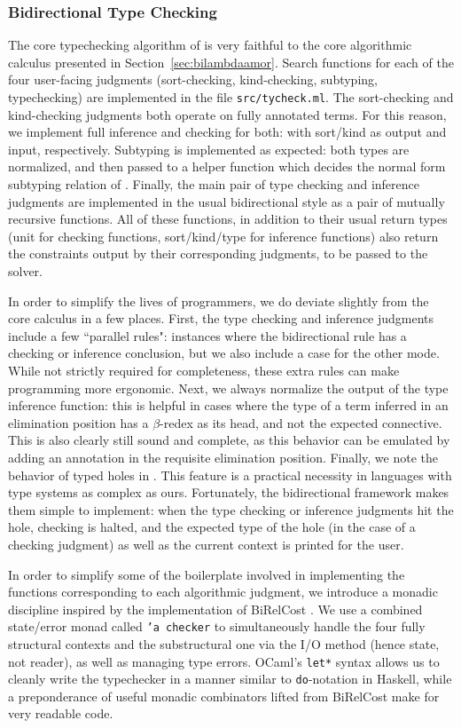 \subsubsection{Bidirectional Type Checking}
The core typechecking algorithm of \lambdaamorimpl is very faithful to the core algorithmic calculus presented in Section~\ref{sec:bilambdaamor}. Search functions for each of the four user-facing judgments (sort-checking, kind-checking, subtyping, typechecking) are implemented in the file \texttt{src/tycheck.ml}. The sort-checking and kind-checking judgments both operate on fully annotated terms. For this reason, we implement full inference and checking for both: with sort/kind as output and input, respectively. Subtyping is implemented as expected: both types are normalized, and then passed to a helper function which decides the normal form subtyping relation of \bilambdaamor. Finally, the main pair of type checking and inference judgments are implemented in the usual bidirectional style as a pair of mutually recursive functions. All of these functions, in addition to their usual return types (unit for checking functions, sort/kind/type for inference functions) also return the constraints output by their corresponding judgments, to be passed to the solver.

In order to simplify the lives of programmers, we do deviate slightly from the core calculus in a few places. First, the type checking and inference judgments include a few ``parallel rules": instances where the bidirectional rule has a checking or inference conclusion, but we also include a case for the other mode. While not strictly required for completeness, these extra rules can make programming more ergonomic. Next, we always normalize the output of the type inference function: this is helpful in cases where the type of a term inferred in an elimination position has a $\beta$-redex as its head, and not the expected connective. This is also clearly still sound and complete, as this behavior can be emulated by adding an annotation in the requisite elimination position. Finally, we note the behavior of typed holes in \lambdaamorimpl. This feature is a practical necessity in languages with type systems as complex as ours. Fortunately, the bidirectional framework makes them simple to implement: when the type checking or inference judgments hit the hole, checking is halted, and the expected type of the hole (in the case of a checking judgment) as well as the current context is printed for the user.

In order to simplify some of the boilerplate involved in implementing the functions corresponding to each algorithmic judgment, we introduce a monadic discipline inspired by the implementation of BiRelCost \citehere. We use a combined state/error monad called \texttt{'a checker} to simultaneously handle the four fully structural contexts and the substructural one via the I/O method (hence state, not reader), as well as managing type errors. OCaml's \texttt{let*} syntax allows us to cleanly write the typechecker in a manner similar to \texttt{do}-notation in Haskell, while a preponderance of useful monadic combinators lifted from BiRelCost make for very readable code.

